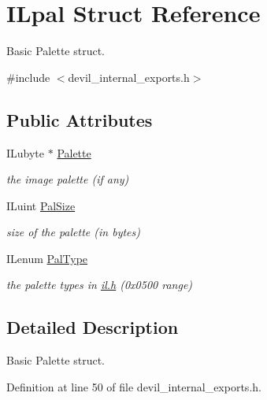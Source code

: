 \hypertarget{structILpal}{}\section{I\+Lpal Struct Reference}
\label{structILpal}


Basic Palette struct.  




{\ttfamily \#include $<$devil\+\_\+internal\+\_\+exports.\+h$>$}

\subsection*{Public Attributes}
\begin{DoxyCompactItemize}
\item 
\mbox{\label{structILpal_abc8ce06b53b2ca4de6bf2ebda303d746}} 
I\+Lubyte $\ast$ \hyperlink{structILpal_abc8ce06b53b2ca4de6bf2ebda303d746}{Palette}
\begin{DoxyCompactList}\small\item\em the image palette (if any) \end{DoxyCompactList}\item 
\mbox{\label{structILpal_a0e64a8c7d3cdd2e63b60c947f118db9b}} 
I\+Luint \hyperlink{structILpal_a0e64a8c7d3cdd2e63b60c947f118db9b}{Pal\+Size}
\begin{DoxyCompactList}\small\item\em size of the palette (in bytes) \end{DoxyCompactList}\item 
\mbox{\label{structILpal_a586f4c7d59e6f202e1d63c67f7679c23}} 
I\+Lenum \hyperlink{structILpal_a586f4c7d59e6f202e1d63c67f7679c23}{Pal\+Type}
\begin{DoxyCompactList}\small\item\em the palette types in \hyperlink{il_8h}{il.\+h} (0x0500 range) \end{DoxyCompactList}\end{DoxyCompactItemize}


\subsection{Detailed Description}
Basic Palette struct. 

Definition at line 50 of file devil\+\_\+internal\+\_\+exports.\+h.



